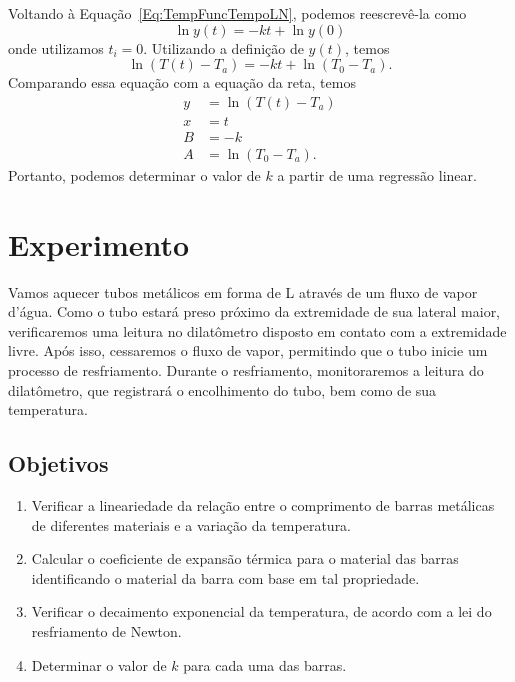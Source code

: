 Voltando à Equação~\ref{Eq:TempFuncTempoLN}, podemos reescrevê-la como
\begin{equation}
	\ln y(t) = -kt + \ln y(0)
\end{equation}
%
onde utilizamos $t_i = 0$. Utilizando a definição de $y(t)$, temos
\begin{equation}
	\ln (T(t) - T_a) = - kt + \ln(T_0 - T_a).
\end{equation}
%
Comparando essa equação com a equação da reta, temos
\begin{subequations}\label{Eq:LinResfriamentoNewton}
\begin{align}
	y &= \ln (T(t) - T_a) \\
	x &= t \\
	B &= -k \\
	A &= \ln(T_0 - T_a).
\end{align}
\end{subequations}
%
Portanto, podemos determinar o valor de $k$ a partir de uma regressão linear.

\section{Experimento}

Vamos aquecer tubos metálicos em forma de L através de um fluxo de vapor d'água. Como o tubo estará preso próximo da extremidade de sua lateral maior, verificaremos uma leitura no dilatômetro disposto em contato com a extremidade livre. Após isso, cessaremos o fluxo de vapor, permitindo que o tubo inicie um processo de resfriamento. Durante o resfriamento, monitoraremos a leitura do dilatômetro, que registrará o encolhimento do tubo, bem como de sua temperatura.

\subsection{Objetivos}
\label{Sec:ObjetivosDilatacaoLinear}

\begin{enumerate}
	\item Verificar a lineariedade da relação entre o comprimento de barras metálicas de diferentes materiais e a variação da temperatura.
	\item Calcular o coeficiente de expansão térmica para o material das barras identificando o material da barra com base em tal propriedade.
	\item Verificar o decaimento exponencial da temperatura, de acordo com a lei do resfriamento de Newton.
	\item Determinar o valor de $k$ para cada uma das barras.
\end{enumerate}

